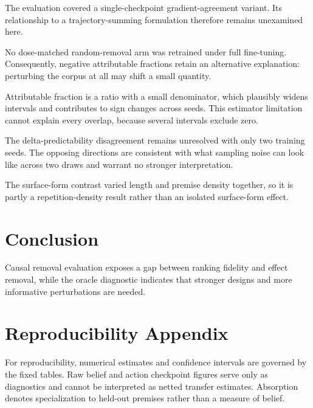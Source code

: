 \documentclass[10pt]{article}
\begin{document}
The evaluation covered a single-checkpoint gradient-agreement variant. Its relationship to a trajectory-summing formulation therefore remains unexamined here.



No dose-matched random-removal arm was retrained under full fine-tuning. Consequently, negative attributable fractions retain an alternative explanation: perturbing the corpus at all may shift a small quantity.



Attributable fraction is a ratio with a small denominator, which plausibly widens intervals and contributes to sign changes across seeds. This estimator limitation cannot explain every overlap, because several intervals exclude zero.



The delta-predictability disagreement remains unresolved with only two training seeds. The opposing directions are consistent with what sampling noise can look like across two draws and warrant no stronger interpretation.



The surface-form contrast varied length and premise density together, so it is partly a repetition-density result rather than an isolated surface-form effect.






\section{ Conclusion }
\label{sec:conclusion}

Causal removal evaluation exposes a gap between ranking fidelity and effect removal, while the oracle diagnostic indicates that stronger designs and more informative perturbations are needed.






\section{ Reproducibility Appendix }
\label{sec:appendix}

For reproducibility, numerical estimates and confidence intervals are governed by the fixed tables. Raw belief and action checkpoint figures serve only as diagnostics and cannot be interpreted as netted transfer estimates. Absorption denotes specialization to held-out premises rather than a measure of belief.
\end{document}
